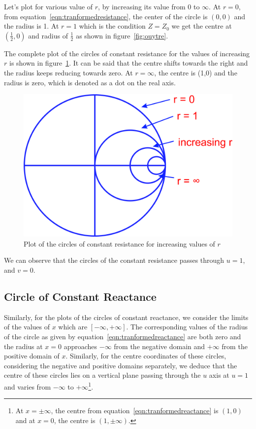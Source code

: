 Let's plot for various value of $r$, by increasing its value from 0 to $\infty$. At $r = 0$, from equation~\eqref{eqn:tranformedresistance}, the center of the circle is $(0,0)$ and the radius is 1. At $r = 1$ which is the condition $Z = Z_0$ we get the centre at $\left(\frac{1}{2}, 0\right)$ and radius of $\frac{1}{2}$ as shown in figure~\ref{fig:ouytre}.

The complete plot of the circles of constant resistance for the values of increasing $r$ is shown in figure~\ref{fig:rghmgfcx}. It can be said that the centre shifts towards the right and the radius keeps reducing towards zero. At $r = \infty$, the centre is (1,0) and the radius is zero, which is denoted as a dot on the real axis.
\begin{figure}[h]
\centering
\includegraphics[width=0.7\linewidth]{./graphics/rghmgfcx}
\caption{Plot of the circles of constant resistance for increasing values of $r$}
\label{fig:rghmgfcx}
\end{figure}

We can observe that the circles of the constant resistance passes through $u = 1$, and $v = 0$.

\subsection{Circle of Constant Reactance}
Similarly, for the plots of the circles of constant reactance, we consider the limits of the values of $x$ which are $[-\infty, +\infty]$. The corresponding values of the radius of the circle as given by equation~\eqref{eqn:tranformedreactance} are both zero and the radius at $x = 0$ approaches $-\infty$ from the negative domain and $+\infty$ from the positive domain of $x$. Similarly, for the centre coordinates of these circles, considering the negative and positive domains separately, we deduce that the centre of these circles lies on a vertical plane passing through the $u$ axis at $u = 1$ and varies from $-\infty$ to $+\infty$\footnote{
At $x = \pm\infty$, the centre from equation~\eqref{eqn:tranformedreactance} is $(1, 0)$ and at $x = 0$, the centre is $(1, \pm\infty)$.
}.

